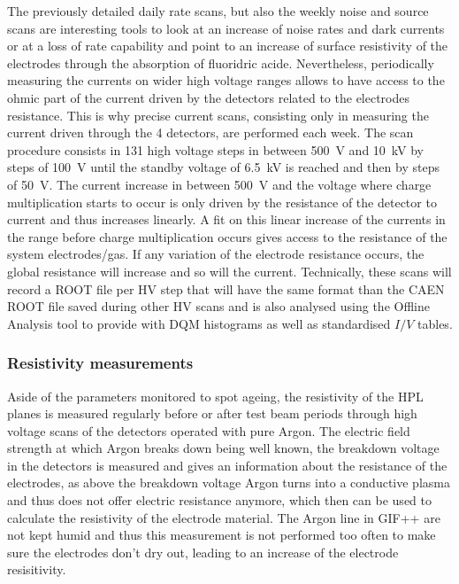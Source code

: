 	The previously detailed daily rate scans, but also the weekly noise and source scans are interesting tools to look at an increase of noise rates and dark currents or at a loss of rate capability and point to an increase of surface resistivity of the electrodes through the absorption of fluoridric acide. Nevertheless, periodically measuring the currents on wider high voltage ranges allows to have access to the ohmic part of the current driven by the detectors related to the electrodes resistance. This is why precise current scans, consisting only in measuring the current driven through the 4 detectors, are performed each week. The scan procedure consists in 131 high voltage steps in between \SI{500}{V} and \SI{10}{kV} by steps of \SI{100}{V} until the standby voltage of \SI{6.5}{kV} is reached and then by steps of \SI{50}{V}. The current increase in between \SI{500}{V} and the voltage where charge multiplication starts to occur is only driven by the resistance of the detector to current and thus increases linearly. A fit on this linear increase of the currents in the range before charge multiplication occurs gives access to the resistance of the system electrodes/gas. If any variation of the electrode resistance occurs, the global resistance will increase and so will the current. Technically, these scans will record a ROOT file per HV step that will have the same format than the CAEN ROOT file saved during other HV scans and is also analysed using the Offline Analysis tool to provide with DQM histograms as well as standardised $I/V$ tables.
	
		\subsubsection{Resistivity measurements}
		\label{chapt5:sssec:resistivity}
	
	Aside of the parameters monitored to spot ageing, the resistivity of the HPL planes is measured regularly before or after test beam periods through high voltage scans of the detectors operated with pure Argon. The electric field strength at which Argon breaks down being well known, the breakdown voltage in the detectors is measured and gives an information about the resistance of the electrodes, as above the breakdown voltage Argon turns into a conductive plasma and thus does not offer electric resistance anymore, which then can be used to calculate the resistivity of the electrode material. The Argon line in GIF++ are not kept humid and thus this measurement is not performed too often to make sure the electrodes don't dry out, leading to an increase of the electrode resisitivity.
	
